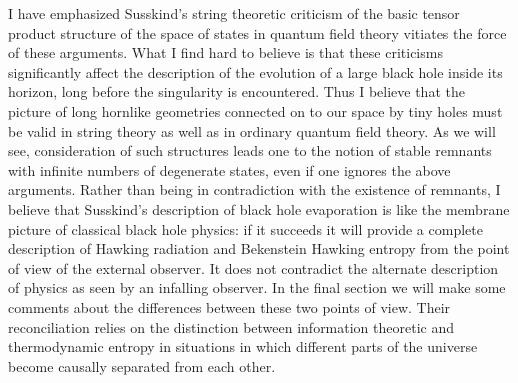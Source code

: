 I have emphasized Susskind's string theoretic
criticism of the basic tensor product structure of
the space of states in quantum field theory vitiates the force of these
arguments.
What I find hard to believe is that these criticisms significantly affect the
description of the evolution of a large black hole inside its horizon, long
before
the singularity is encountered.  Thus I believe that the picture of long
hornlike
geometries connected on to our space by tiny holes must be valid in string
theory as
well as in ordinary quantum field theory.
As we will see, consideration of such structures leads one to the notion
of stable remnants with infinite numbers of degenerate states, even if one
ignores
the above arguments.  Rather than being in contradiction with the existence of
remnants, I believe that Susskind's description of black hole
evaporation is like the membrane picture of classical black hole physics: if
it succeeds
it will provide a complete description of Hawking radiation and Bekenstein
Hawking entropy from
the point of view of the external observer.  It does not contradict the
alternate
description of physics as seen by an infalling observer.  In the final section
we will make some
comments about the differences between these two points of view.  Their
reconciliation relies on the distinction between information theoretic and
thermodynamic entropy in situations in which different parts of the universe
 become causally separated from each other.



